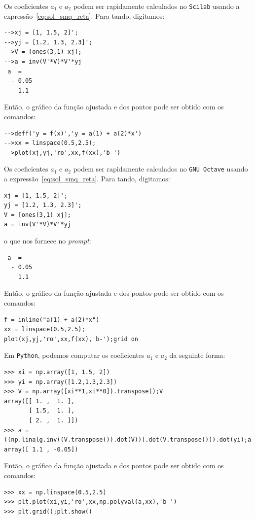 \begin{sol}
\ifisscilab
Os coeficientes $a_1$ e $a_2$ podem ser rapidamente calculados no \verb+Scilab+ usando a expressão~\eqref{eq:sol_smq_reta}. Para tando, digitamos:
\begin{verbatim}
-->xj = [1, 1.5, 2]';  
-->yj = [1.2, 1.3, 2.3]'; 
-->V = [ones(3,1) xj]; 
-->a = inv(V'*V)*V'*yj 
 a  =
  - 0.05  
    1.1   
\end{verbatim}
Então, o gráfico da função ajustada e dos pontos pode ser obtido com os comandos:
\begin{verbatim}
-->deff('y = f(x)','y = a(1) + a(2)*x')
-->xx = linspace(0.5,2.5); 
-->plot(xj,yj,'ro',xx,f(xx),'b-')
\end{verbatim}
\fi
\ifisoctave
Os coeficientes $a_1$ e $a_2$ podem ser rapidamente calculados no \verb+GNU Octave+ usando a expressão~\eqref{eq:sol_smq_reta}. Para tando, digitamos:
\begin{verbatim}
xj = [1, 1.5, 2]';
yj = [1.2, 1.3, 2.3]';
V = [ones(3,1) xj];
a = inv(V'*V)*V'*yj
\end{verbatim}
o que nos fornece no {\it prompt}:
\begin{verbatim}
 a  =
  - 0.05  
    1.1     
\end{verbatim}
Então, o gráfico da função ajustada e dos pontos pode ser obtido com os comandos:
\begin{verbatim}
f = inline("a(1) + a(2)*x")
xx = linspace(0.5,2.5); 
plot(xj,yj,'ro',xx,f(xx),'b-');grid on
\end{verbatim}
\fi
\ifispython
Em \verb+Python+, podemos computar os coeficientes $a_1$ e $a_2$ da seguinte forma:
\begin{verbatim}
>>> xi = np.array([1, 1.5, 2])
>>> yi = np.array([1.2,1.3,2.3])
>>> V = np.array([xi**1,xi**0]).transpose();V
array([[ 1. ,  1. ],
       [ 1.5,  1. ],
       [ 2. ,  1. ]])
>>> a = ((np.linalg.inv((V.transpose()).dot(V))).dot(V.transpose())).dot(yi);a
array([ 1.1 , -0.05])
\end{verbatim}
Então, o gráfico da função ajustada e dos pontos pode ser obtido com os comandos:
\begin{verbatim}
>>> xx = np.linspace(0.5,2.5)
>>> plt.plot(xi,yi,'ro',xx,np.polyval(a,xx),'b-')
>>> plt.grid();plt.show()
\end{verbatim}
\fi

\end{sol}

